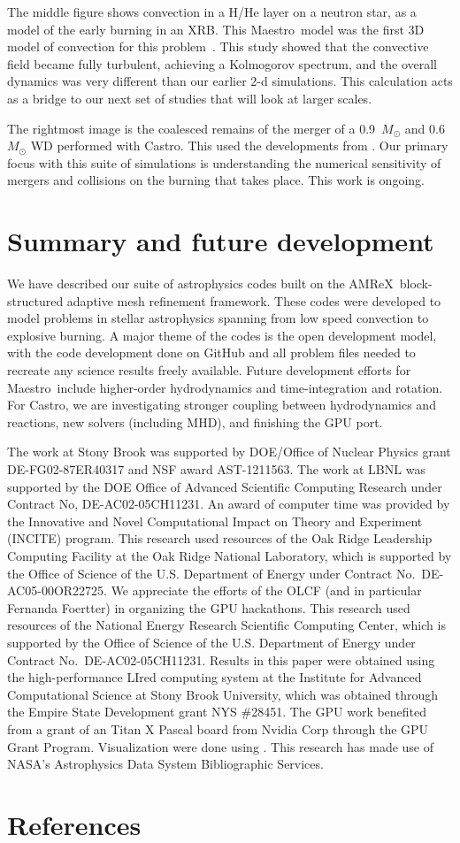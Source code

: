 \documentclass[a4paper]{jpconf}
\newcommand{\maestro}{{\sffamily Maestro}}
\newcommand{\castro}{{\sffamily Castro}}
\newcommand{\amrex}{{\sffamily AMReX}}
\begin{document}
The middle figure shows convection in a H/He layer on a neutron star,
as a model of the early burning in an XRB.  This \maestro\ model was
the first 3D model of convection for this problem~\cite{xrb3}.  This
study showed that the convective field became fully turbulent,
achieving a Kolmogorov spectrum, and the overall dynamics was very
different than our earlier 2-d simulations.  This calculation acts as 
a bridge to our next set of studies that will look at larger scales.

The rightmost image is the coalesced remains of the merger of a
0.9~$M_\odot$ and 0.6~$M_\odot$ WD performed with \castro.  This used
the developments from \cite{wdmergerI}.  Our primary focus with this
suite of simulations is understanding the numerical sensitivity of
mergers and collisions on the burning that takes place.  This work
is ongoing.


\section{Summary and future development}

We have described our suite of astrophysics codes built on the
\amrex\ block-structured adaptive mesh refinement framework.  These
codes were developed to model problems in stellar astrophysics
spanning from low speed convection to explosive burning.  A major
theme of the codes is the open development model, with the code
development done on GitHub and all problem files needed to recreate
any science results freely available.  Future development efforts for
\maestro\ include higher-order hydrodynamics and time-integration and
rotation.  For \castro, we are investigating stronger coupling between
hydrodynamics and reactions, new solvers (including MHD), and
finishing the GPU port.



\ack The work at Stony Brook was supported by DOE/Office of Nuclear
Physics grant DE-FG02-87ER40317 and NSF award AST-1211563.  The work
at LBNL was supported by the DOE Office of Advanced Scientific
Computing Research under Contract No, DE-AC02-05CH11231. An award of
computer time was provided by the Innovative and Novel Computational
Impact on Theory and Experiment (INCITE) program.  This research used
resources of the Oak Ridge Leadership Computing Facility at the Oak
Ridge National Laboratory, which is supported by the Office of Science
of the U.S. Department of Energy under Contract
No.\ DE-AC05-00OR22725.  We appreciate the efforts of the OLCF (and in
particular Fernanda Foertter) in organizing the GPU hackathons.  This
research used resources of the National Energy Research Scientific
Computing Center, which is supported by the Office of Science of the
U.S. Department of Energy under Contract No.\ DE-AC02-05CH11231.
Results in this paper were obtained using the high-performance LIred
computing system at the Institute for Advanced Computational Science
at Stony Brook University, which was obtained through the Empire State
Development grant NYS \#28451.  The GPU work benefited from a grant of
an Titan X Pascal board from Nvidia Corp through the GPU Grant
Program.  Visualization were done using \cite{yt}.  This research has
made use of NASA's Astrophysics Data System Bibliographic Services.

\section*{References}



\end{document}
